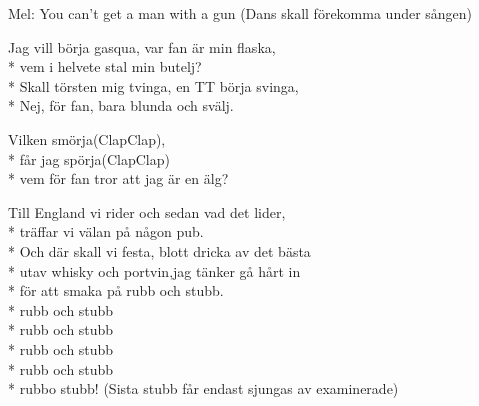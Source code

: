 \begin{SongText}
    \begin{SongInfo}
        Mel: You can’t get a man with a gun
        (Dans skall förekomma under sången)
    \end{SongInfo}
    \begin{SongVerse}
        Jag vill börja gasqua, var fan är min flaska,\\*%
        vem i helvete stal min butelj?\\*%
        Skall törsten mig tvinga, en TT börja svinga,\\*%
        Nej, för fan, bara blunda och svälj.
    \end{SongVerse}
    \begin{SongVerse}
        Vilken smörja(ClapClap),\\*%
        får jag spörja(ClapClap)\\*%
        vem för fan tror att jag är en älg?
    \end{SongVerse}
    \begin{SongVerse}
        Till England vi rider och sedan vad det lider,\\*%
        träffar vi välan på någon pub.\\*%
        Och där skall vi festa, blott dricka av det bästa\\*%
        utav whisky och portvin,jag tänker gå hårt in\\*%
        för att smaka på rubb och stubb.\\*%
        rubb och stubb\\*%
        rubb och stubb\\*%
        rubb och stubb\\*%
        rubb och stubb\\*%
        rubbo stubb! (Sista stubb får endast sjungas av
        examinerade)
    \end{SongVerse}
\end{SongText}
